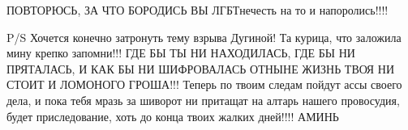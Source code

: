 ПОВТОРЮСЬ, ЗА ЧТО БОРОДИСЬ ВЫ ЛГБТнечесть на то и напоролись!!!!

P/S Хочется конечно затронуть тему взрыва Дугиной! Та курица, что заложила мину крепко запомни!!! ГДЕ БЫ ТЫ НИ НАХОДИЛАСЬ, ГДЕ БЫ НИ ПРЯТАЛАСЬ, И КАК БЫ НИ ШИФРОВАЛАСЬ ОТНЫНЕ ЖИЗНЬ ТВОЯ НИ СТОИТ И ЛОМОНОГО ГРОША!!! Теперь по твоим следам пойдут ассы своего дела, и пока тебя мразь за шиворот ни притащат на алтарь нашего провосудия, будет приследование, хоть до конца твоих жалких дней!!!! АМИНЬ


